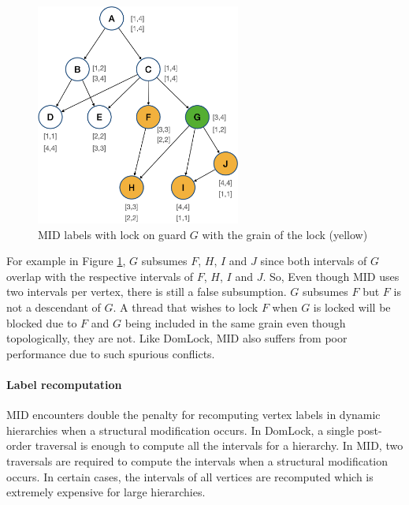 \begin{figure}[H]
    \centering
    \captionsetup{justification=centering}
    \includegraphics[width=0.6\textwidth]{figures/MID_example_with_lock.png}
    \caption{MID labels with lock on guard $G$ with the grain of the lock (yellow)}
    \label{fig:MID_example_locked}
\end{figure}

For example in Figure \ref{fig:MID_example_locked}, $G$ subsumes $F$, $H$, $I$ and $J$ since both intervals of $G$ overlap with the respective intervals of $F$, $H$, $I$ and $J$. So, Even though MID uses two intervals per vertex, there is still a false subsumption. $G$ subsumes $F$ but $F$ is not a descendant of $G$. A thread that wishes to lock $F$ when $G$ is locked will be blocked due to $F$ and $G$ being included in the same grain even though topologically, they are not. Like DomLock, MID also suffers from poor performance due to such spurious conflicts.

\paragraph{Label recomputation}
MID encounters double the penalty for recomputing vertex labels in dynamic hierarchies when a structural modification occurs. In DomLock, a single post-order traversal is enough to compute all the intervals for a hierarchy. In MID, two traversals are required to compute the intervals when a structural modification occurs. In certain cases, the intervals of all vertices are recomputed which is extremely expensive for large hierarchies.

